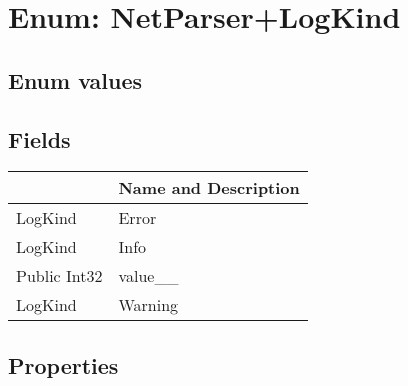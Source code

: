 \documentclass[11pt, oneside, a4paper]{book}
\begin{document}
\hypertarget{SoftwareEngineeringTools.{}Documentation.{}NetParser+LogKind}{}
\section{Enum: NetParser+LogKind}

\subsection{Enum values}

\subsection{Fields}
\begin{center}
\begin{tabular}{| p{3cm} | p{12cm} | }
\hline
\textbf{ } & \textbf{ Name and Description}\\
\hline
 LogKind &  Error\hypertarget{SoftwareEngineeringTools.{}Documentation.{}NetParser+LogKind.{}Error}{}\\
\hline
 LogKind &  Info\hypertarget{SoftwareEngineeringTools.{}Documentation.{}NetParser+LogKind.{}Info}{}\\
\hline
 Public  Int32 &  value\_\_\hypertarget{SoftwareEngineeringTools.{}Documentation.{}NetParser+LogKind.{}value\_\_}{}\\
\hline
 LogKind &  Warning\hypertarget{SoftwareEngineeringTools.{}Documentation.{}NetParser+LogKind.{}Warning}{}\\
\hline
\end{tabular}
\end{center}

\subsection{Properties}
\end{document}
